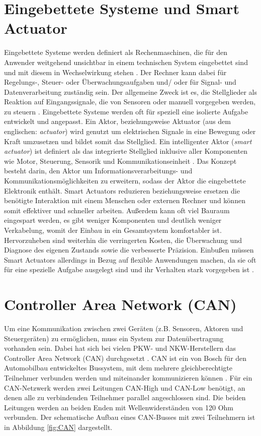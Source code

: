 \section{Eingebettete Systeme und Smart Actuator}
Eingebettete Systeme werden definiert als Rechenmaschinen, die für den Anwender weitgehend unsichtbar in einem technischen System eingebettet sind und mit diesem in Wechselwirkung stehen \cite[S.8]{Gessler2014}. Der Rechner kann dabei für Regelungs-, Steuer- oder Überwachungsaufgaben und/ oder für Signal- und Datenverarbeitung zuständig sein. Der allgemeine Zweck ist es, die Stellglieder als Reaktion auf Eingangssignale, die von Sensoren oder manuell vorgegeben werden, zu steuern \cite[S.1]{Broy2003}. Eingebettete Systeme werden oft für speziell eine isolierte Aufgabe entwickelt und angepasst.
Ein Aktor, beziehungsweise Aktuator (aus dem englischen: \textit{actuator}) wird genutzt um elektrischen Signale in eine Bewegung oder Kraft umzusetzen und bildet somit das Stellglied. 
Ein intelligenter Aktor (\textit{smart actuator}) ist definiert als das integrierte Stellglied inklusive aller Komponenten wie Motor, Steuerung, Sensorik und Kommunikationseinheit \cite[S.442]{smartactuator}.
Das Konzept besteht darin, den Aktor um Informationsverarbeitungs- und Kommunikationsmöglichkeiten zu erweitern, sodass der Aktor die eingebettete Elektronik enthält.
Smart Actuators reduzieren beziehungsweise ersetzen die benötigte Interaktion mit einem Menschen oder externen Rechner und können somit effektiver und schneller arbeiten. Außerdem kann oft viel Bauraum eingespart werden, es gibt weniger Komponenten und deutlich weniger Verkabelung, womit der Einbau in ein Gesamtsystem komfortabler ist. Hervorzuheben sind weiterhin die verringerten Kosten, die Überwachung und Diagnose des eigenen Zustands sowie die verbesserte Präzision. Einbußen müssen Smart Actuators allerdings in Bezug auf flexible Anwendungen machen, da sie oft für eine spezielle Aufgabe ausgelegt sind und ihr Verhalten stark vorgegeben ist \cite[S.4]{smartaktor}.


\section{Controller Area Network (CAN)}
Um eine Kommunikation zwischen zwei Geräten (z.B. Sensoren, Aktoren und Steuergeräten) zu ermöglichen, muss ein System zur Datenübertragung vorhanden sein. Dabei hat sich bei vielen PKW- und NKW-Herstellern  das Controller Area Network (CAN) durchgesetzt \cite[S.57]{Werner2014}. CAN ist ein von Bosch für den Automobilbau entwickeltes Bussystem, mit dem mehrere gleichberechtigte Teilnehmer verbunden werden und miteinander kommunizieren können \cite[S. 278]{Woern2006}.
Für ein CAN-Netzwerk werden zwei Leitungen CAN-High und CAN-Low benötigt, an denen alle zu verbindenden Teilnehmer parallel angeschlossen sind. Die beiden Leitungen werden an beiden Enden mit Wellenwiderständen von 120 Ohm verbunden. Der schematische Aufbau eines CAN-Busses mit zwei Teilnehmern ist in Abbildung \ref{fig:CAN} dargestellt. 

